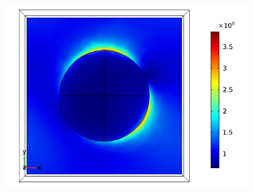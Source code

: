 \begin{figure}[htb!]
\begin{subfigure}{0.32\textwidth}
        \centering
        \includegraphics[width=\linewidth]{figures/ch4/S5A/FieldDistribution/phi25/Sample5A_TE_Slice@z=0_wl=300_phi=25.png}
   \end{subfigure}


\end{figure}

